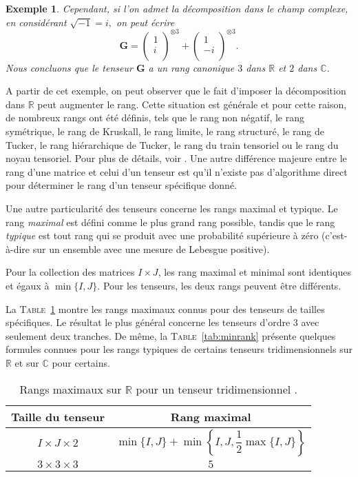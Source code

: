 \documentclass[11pt,a4paper,oneside]{book}
\newtheorem{ex}{Exemple}[chapter]}
\def\R{\mathbb R}
\def\C{\mathbb C}
\newcommand{\f}[2]{\dfrac{#1}{#2}}
\newcommand{\mbf}[1]{\mathbf{#1}}
\newcommand{\tabref}[1]{\textsc{Table}~\ref{#1}}
\begin{document}
\begin{ex}
	Cependant, si l'on admet la décomposition dans le champ complexe, en considérant $\sqrt{-1} = i,$  on peut écrire $$
	\mbf{G} =
	\begin{pmatrix}
	1\\
	i\\
	\end{pmatrix}
	^{\otimes 3}+
	\begin{pmatrix}
	1\\
	-i\\
	\end{pmatrix}
	^{\otimes 3}.
	$$
	Nous concluons que le tenseur $\mbf{G}$  a un rang canonique $ 3 $ dans $ \R $ et $ 2 $ dans $ \C $.
\end{ex}

A partir de cet exemple, on peut observer que le fait d'imposer la décomposition dans $ \R $ peut augmenter le rang. Cette situation est générale et pour cette raison, de nombreux rangs ont été définis, tels que le rang non négatif, le rang symétrique, le rang de Kruskall, le rang limite, le rang structuré, le rang de Tucker, le rang hiérarchique de Tucker, le rang du train tensoriel ou le rang du noyau tensoriel. Pour plus de détails, voir \cite{comon2014tensors}.  Une autre différence majeure entre le rang d'une matrice et celui d'un tenseur est qu'il n'existe pas d'algorithme direct pour  déterminer le rang d'un tenseur spécifique donné.


Une autre particularité des tenseurs concerne les rangs maximal et typique. Le rang \textit{maximal} est défini comme le plus grand rang possible, tandis que le rang  \textit{typique} est tout rang qui se produit avec une probabilité supérieure à zéro (c'est-à-dire sur un ensemble avec une mesure de Lebesgue positive).

Pour la collection des matrices $ I\times J $, les rang maximal et minimal sont identiques et égaux à $\min\{I,J\}  $. Pour les tenseurs, les deux rangs peuvent être différents. %

La \tabref{tab:maxrank} montre les rangs maximaux connus pour des tenseurs de tailles spécifiques. Le résultat le plus général concerne les tenseurs d'ordre 3 avec seulement deux tranches. De même, la \tabref{tab:minrank} présente quelques formules connues pour les rangs typiques de certains tenseurs tridimensionnels sur $ \R $ et sur $ \C $ pour certains.

\begin{table}[htbp]
	\centering
	\caption{Rangs maximaux sur $ \R $ pour un tenseur tridimensionnel \cite[p.465]{Hong2008}.}
	\label{tab:maxrank}
	\begin{tabular}{|c|c|}
		\hline
		\hline
		Taille du tenseur&Rang maximal\\
		\hline
		$ I\times J\times 2 $&$ \min\{I,J\}+\min\left\{I,J,\f{1}{2}\max\{I,J\}\right\} $\\
		\hline
		$ 3\times 3\times 3 $&$ 5 $\\
		\hline
		\hline
	\end{tabular}
\end{table}
\end{document}
